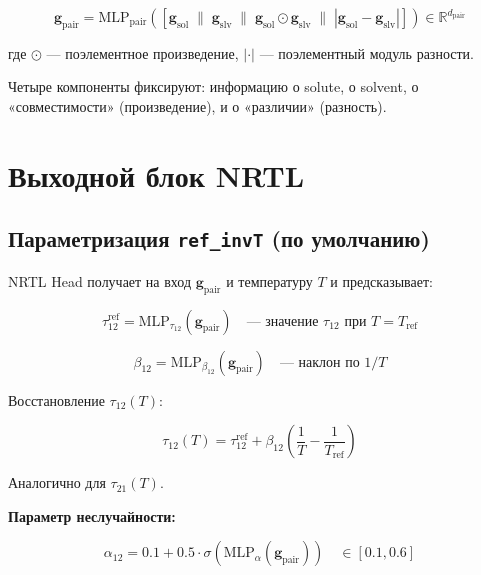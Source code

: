 \documentclass[11pt]{article}
\begin{document}
\begin{equation*}
\mathbf{g}_{\mathrm{pair}} = \mathrm{MLP}_{\mathrm{pair}}\!\left([\mathbf{g}_{\mathrm{sol}} \;\|\; \mathbf{g}_{\mathrm{slv}} \;\|\; \mathbf{g}_{\mathrm{sol}} \odot \mathbf{g}_{\mathrm{slv}} \;\|\; |\mathbf{g}_{\mathrm{sol}} - \mathbf{g}_{\mathrm{slv}}|]\right) \in \mathbb{R}^{d_{\mathrm{pair}}}
\end{equation*}

где $\odot$ --- поэлементное произведение, $|\cdot|$ --- поэлементный модуль разности.

Четыре компоненты фиксируют: информацию о solute, о solvent, о «совместимости» (произведение), и о «различии» (разность).

\section{Выходной блок NRTL}

\subsection{Параметризация \texttt{ref\_invT} (по умолчанию)}

NRTL Head получает на вход $\mathbf{g}_{\mathrm{pair}}$ и температуру $T$ и предсказывает:

\begin{equation*}
\tau_{12}^{\mathrm{ref}} = \mathrm{MLP}_{\tau_{12}}(\mathbf{g}_{\mathrm{pair}}) \quad \text{--- значение } \tau_{12} \text{ при } T = T_{\mathrm{ref}}
\end{equation*}

\begin{equation*}
\beta_{12} = \mathrm{MLP}_{\beta_{12}}(\mathbf{g}_{\mathrm{pair}}) \quad \text{--- наклон по } 1/T
\end{equation*}

Восстановление $\tau_{12}(T)$:

\begin{equation*}
\tau_{12}(T) = \tau_{12}^{\mathrm{ref}} + \beta_{12}\!\left(\frac{1}{T} - \frac{1}{T_{\mathrm{ref}}}\right)
\end{equation*}

Аналогично для $\tau_{21}(T)$.

\textbf{Параметр неслучайности:}

\begin{equation*}
\alpha_{12} = 0.1 + 0.5 \cdot \sigma\!\left(\mathrm{MLP}_{\alpha}(\mathbf{g}_{\mathrm{pair}})\right) \quad \in [0.1, 0.6]
\end{equation*}
\end{document}
